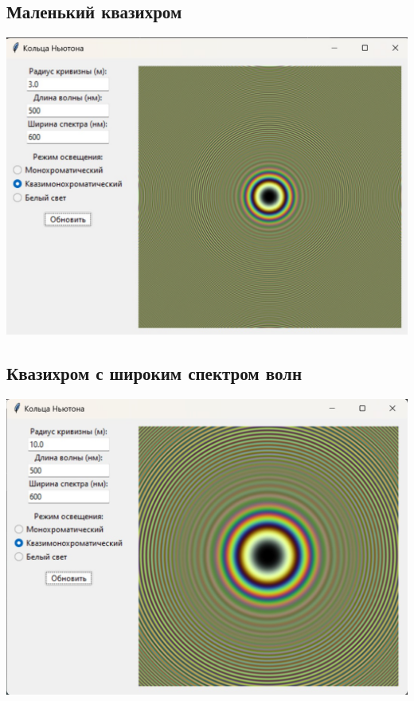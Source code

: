 \documentclass[a4paper,11pt]{article}
\theoremstyle{definition}
\begin{document}
    \subsection{Маленький квазихром}
    \includegraphics[scale=0.7]{3. Newton's rings/demo results/small_quasi}

    \subsection{Квазихром с широким спектром волн}
    \includegraphics[scale=0.7]{3. Newton's rings/demo results/wideSpectre_quasi}
\end{document}
